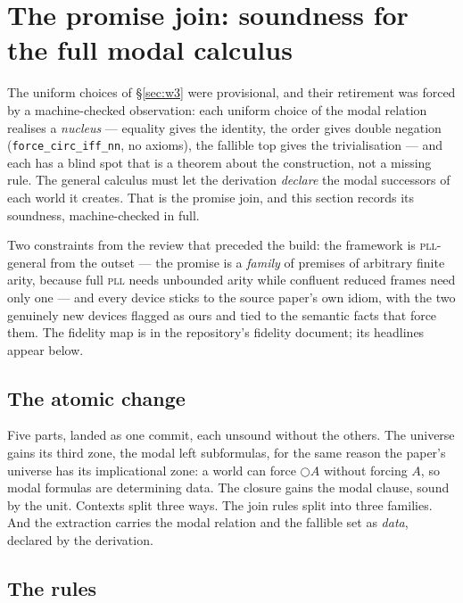 \documentclass[11pt,a4paper]{article}
\begin{document}
\section{The promise join: soundness for the full modal calculus}
\label{sec:promise}

The uniform choices of \S\ref{sec:w3} were provisional, and their
retirement was forced by a machine-checked observation: each uniform
choice of the modal relation realises a \emph{nucleus} --- equality gives
the identity, the order gives double negation
(\texttt{force\_circ\_iff\_nn}, no axioms), the fallible top gives the
trivialisation --- and each has a blind spot that is a theorem about the
construction, not a missing rule.  The general calculus must let the
derivation \emph{declare} the modal successors of each world it creates.
That is the promise join, and this section records its soundness,
machine-checked in full.

Two constraints from the review that preceded the build: the framework is
\textsc{pll}-general from the outset --- the promise is a \emph{family}
of premises of arbitrary finite arity, because full \textsc{pll} needs
unbounded arity while confluent reduced frames need only one --- and
every device sticks to the source paper's own idiom, with the two
genuinely new devices flagged as ours and tied to the semantic facts that
force them.  The fidelity map is in the repository's fidelity document;
its headlines appear below.

\subsection{The atomic change}

Five parts, landed as one commit, each unsound without the others.  The
universe gains its third zone, the modal left subformulas, for the same
reason the paper's universe has its implicational zone: a world can force
$\bigcirc A$ without forcing $A$, so modal formulas are determining data.
The closure gains the modal clause, sound by the unit.  Contexts split
three ways.  The join rules split into three families.  And the
extraction carries the modal relation and the fallible set as
\emph{data}, declared by the derivation.

\subsection{The rules}
\end{document}
